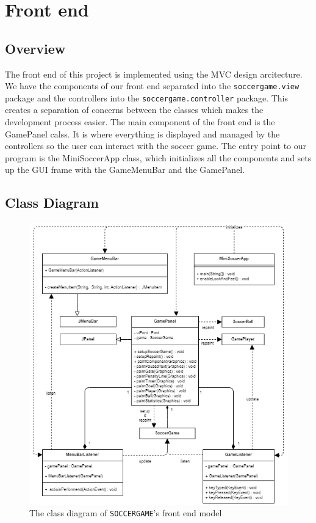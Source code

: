 \documentclass[12pt, dvipsnames, a4paper]{article}
\newcommand{\code}[1]{\texttt{#1}}
\begin{document}
\section{Front end}
\subsection{Overview}
The front end of this project is implemented using the MVC design arcitecture. We have the components
of our front end separated into the \code{soccergame.view} package and the controllers into the \code{soccergame.controller} package.
This creates a separation of concerns between the classes which makes the development process easier.
The main component of the front end is the GamePanel calss. It is where everything is displayed and managed by the controllers
so the user can interact with the soccer game. The entry point to our program is the MiniSoccerApp class, which initializes
all the components and sets up the GUI frame with the GameMenuBar and the GamePanel.
\subsection{Class Diagram}
\begin{center}
	\begin{figure}[H]
		\hspace{-20pt}
		\includegraphics[scale=1]{diagrams/class-diagrams/gui-model/gui-model-cd.png}
		\caption{The class diagram of \code{SOCCERGAME}'s front end model}
		\label{fig:frontend}
	\end{figure}
\end{center}
\clearpage
\end{document}
